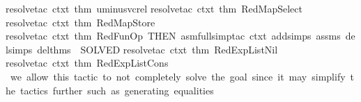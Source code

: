 \begin{isabellebody}
resolve{\isacharunderscore}{\kern0pt}tac\ ctxt\ {\isacharbrackleft}{\kern0pt}{\isacharat}{\kern0pt}{\isacharbraceleft}{\kern0pt}thm\ uminus{\isacharunderscore}{\kern0pt}vc{\isacharunderscore}{\kern0pt}rel{\isacharbraceright}{\kern0pt}{\isacharbrackright}{\kern0pt}{\isacharcomma}{\kern0pt}\isanewline
\isanewline
\isanewline
{\isacharparenleft}{\kern0pt}resolve{\isacharunderscore}{\kern0pt}tac\ ctxt\ {\isacharbrackleft}{\kern0pt}{\isacharat}{\kern0pt}{\isacharbraceleft}{\kern0pt}thm\ RedMapSelect{\isacharbraceright}{\kern0pt}{\isacharbrackright}{\kern0pt}{\isacharparenright}{\kern0pt}{\isacharcomma}{\kern0pt}\isanewline
{\isacharparenleft}{\kern0pt}resolve{\isacharunderscore}{\kern0pt}tac\ ctxt\ {\isacharbrackleft}{\kern0pt}{\isacharat}{\kern0pt}{\isacharbraceleft}{\kern0pt}thm\ RedMapStore{\isacharbraceright}{\kern0pt}{\isacharbrackright}{\kern0pt}{\isacharparenright}{\kern0pt}{\isacharcomma}{\kern0pt}\isanewline
\isanewline
{\isacharparenleft}{\kern0pt}resolve{\isacharunderscore}{\kern0pt}tac\ ctxt\ {\isacharbrackleft}{\kern0pt}{\isacharat}{\kern0pt}{\isacharbraceleft}{\kern0pt}thm\ RedFunOp{\isacharbraceright}{\kern0pt}{\isacharbrackright}{\kern0pt}\ THEN{\isacharprime}{\kern0pt}\ {\isacharparenleft}{\kern0pt}asm{\isacharunderscore}{\kern0pt}full{\isacharunderscore}{\kern0pt}simp{\isacharunderscore}{\kern0pt}tac\ {\isacharparenleft}{\kern0pt}ctxt\ addsimps\ assms\ delsimps\ del{\isacharunderscore}{\kern0pt}thms{\isacharparenright}{\kern0pt}\ {\isacharbar}{\kern0pt}{\isachargreater}{\kern0pt}\ SOLVED{\isacharprime}{\kern0pt}{\isacharparenright}{\kern0pt}{\isacharparenright}{\kern0pt}{\isacharcomma}{\kern0pt}\isanewline
{\isacharparenleft}{\kern0pt}resolve{\isacharunderscore}{\kern0pt}tac\ ctxt\ {\isacharbrackleft}{\kern0pt}{\isacharat}{\kern0pt}{\isacharbraceleft}{\kern0pt}thm\ RedExpListNil{\isacharbraceright}{\kern0pt}{\isacharbrackright}{\kern0pt}{\isacharparenright}{\kern0pt}{\isacharcomma}{\kern0pt}\isanewline
{\isacharparenleft}{\kern0pt}resolve{\isacharunderscore}{\kern0pt}tac\ ctxt\ {\isacharbrackleft}{\kern0pt}{\isacharat}{\kern0pt}{\isacharbraceleft}{\kern0pt}thm\ RedExpListCons{\isacharbraceright}{\kern0pt}{\isacharbrackright}{\kern0pt}{\isacharparenright}{\kern0pt}{\isacharcomma}{\kern0pt}\isanewline
{\isacharparenleft}{\kern0pt}{\isacharasterisk}{\kern0pt}\ we\ allow\ this\ tactic\ to\ not\ completely\ solve\ the\ goal{\isacharcomma}{\kern0pt}\ since\ it\ may\ simplify\ the\ tactics\ further\ {\isacharparenleft}{\kern0pt}such\ as\ generating\ equalities{\isacharparenright}{\kern0pt}\ {\isacharasterisk}{\kern0pt}{\isacharparenright}{\kern0pt}\isanewline

\end{isabellebody}
